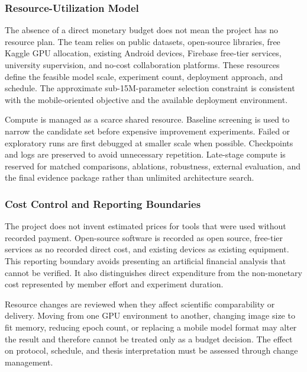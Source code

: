 \subsubsection{Resource-Utilization Model}
The absence of a direct monetary budget does not mean the project has no resource plan. The team relies on public datasets, open-source libraries, free Kaggle GPU allocation, existing Android devices, Firebase free-tier services, university supervision, and no-cost collaboration platforms. These resources define the feasible model scale, experiment count, deployment approach, and schedule. The approximate sub-15M-parameter selection constraint is consistent with the mobile-oriented objective and the available deployment environment.\par
Compute is managed as a scarce shared resource. Baseline screening is used to narrow the candidate set before expensive improvement experiments. Failed or exploratory runs are first debugged at smaller scale when possible. Checkpoints and logs are preserved to avoid unnecessary repetition. Late-stage compute is reserved for matched comparisons, ablations, robustness, external evaluation, and the final evidence package rather than unlimited architecture search.\par
\subsubsection{Cost Control and Reporting Boundaries}
The project does not invent estimated prices for tools that were used without recorded payment. Open-source software is recorded as open source, free-tier services as no recorded direct cost, and existing devices as existing equipment. This reporting boundary avoids presenting an artificial financial analysis that cannot be verified. It also distinguishes direct expenditure from the non-monetary cost represented by member effort and experiment duration.\par
Resource changes are reviewed when they affect scientific comparability or delivery. Moving from one GPU environment to another, changing image size to fit memory, reducing epoch count, or replacing a mobile model format may alter the result and therefore cannot be treated only as a budget decision. The effect on protocol, schedule, and thesis interpretation must be assessed through change management.\par
